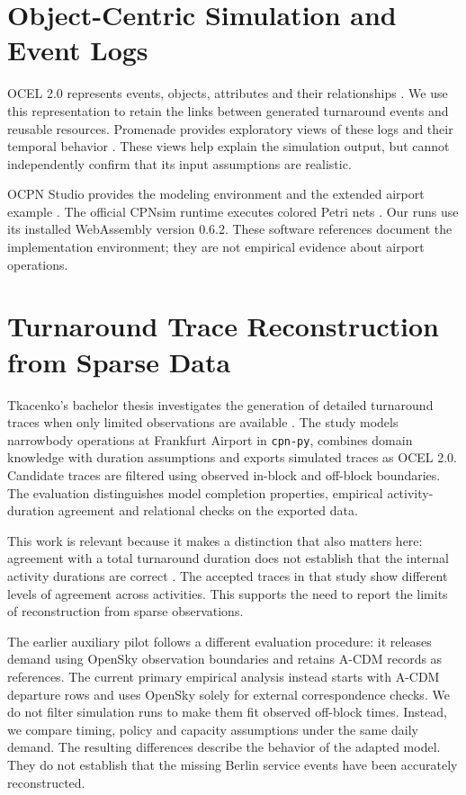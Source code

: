 \section{Object-Centric Simulation and Event Logs}
OCEL 2.0 represents events, objects, attributes and their relationships \cite{ocel2}. We use this representation to retain the links between generated turnaround events and reusable resources. Promenade provides exploratory views of these logs and their temporal behavior \cite{promenade}. These views help explain the simulation output, but cannot independently confirm that its input assumptions are realistic.

OCPN Studio provides the modeling environment and the extended airport example \cite{ocpn_studio}. The official CPNsim runtime executes colored Petri nets \cite{cpnsim}. Our runs use its installed WebAssembly version 0.6.2. These software references document the implementation environment; they are not empirical evidence about airport operations.

\section{Turnaround Trace Reconstruction from Sparse Data}
Tkacenko's bachelor thesis investigates the generation of detailed turnaround traces when only limited observations are available \cite{tkacenko2026}. The study models narrowbody operations at Frankfurt Airport in \texttt{cpn-py}, combines domain knowledge with duration assumptions and exports simulated traces as OCEL 2.0. Candidate traces are filtered using observed in-block and off-block boundaries. The evaluation distinguishes model completion properties, empirical activity-duration agreement and relational checks on the exported data.

This work is relevant because it makes a distinction that also matters here: agreement with a total turnaround duration does not establish that the internal activity durations are correct \cite[Sections~6.2 and~7.4]{tkacenko2026}. The accepted traces in that study show different levels of agreement across activities. This supports the need to report the limits of reconstruction from sparse observations.

The earlier auxiliary pilot follows a different evaluation procedure: it releases demand using OpenSky observation boundaries and retains A-CDM records as references. The current primary empirical analysis instead starts with A-CDM departure rows and uses OpenSky solely for external correspondence checks. We do not filter simulation runs to make them fit observed off-block times. Instead, we compare timing, policy and capacity assumptions under the same daily demand. The resulting differences describe the behavior of the adapted model. They do not establish that the missing Berlin service events have been accurately reconstructed.

